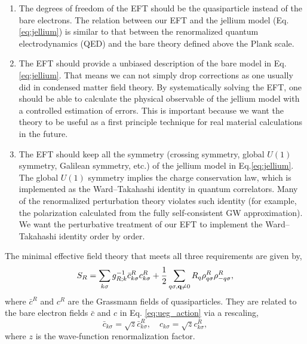 \documentclass[reprint,amsmath,amssymb,aps,prb]{revtex4-1}
\begin{document}
\begin{enumerate}
    \item The degrees of freedom of the EFT should be the quasiparticle instead of the bare electrons. The relation between our EFT and the jellium model (Eq.\eqref{eq:jellium}) is similar to that between the renormalized quantum electrodynamics (QED) and the bare theory defined above the Plank scale.

    \item The EFT should provide a unbiased description of the bare model in Eq.\eqref{eq:jellium}. That means we can not simply drop corrections as one usually did in condensed matter field theory. By systematically solving the EFT, one should be able to calculate the physical observable of the jellium model with a controlled estimation of errors. This is important because we want the theory to be useful as a first principle technique for real material calculations in the future.

    \item The EFT should keep all the symmetry (crossing symmetry, global $U(1)$ symmetry, Galilean symmetry, etc.) of the jellium model in Eq.\eqref{eq:jellium}. The global $U(1)$ symmetry implies the charge conservation law, which is implemented as the Ward–Takahashi identity in quantum correlators. Many of the renormalized perturbation theory violates such identity (for example, the polarization calculated from the fully self-consistent GW approximation). We want the perturbative treatment of our EFT to implement the Ward–Takahashi identity order by order.
\end{enumerate}

The minimal effective field theory that meets all three requirements are given by,
\begin{equation}
    \label{eq:renorm_action}
    S_R=\sum_{k \sigma} g_{R;k}^{-1}\bar{c}^R_{k \sigma} c^R_{k \sigma} + \frac{1}{2}\sum_{q\sigma, \mathbf{q} \neq 0}  R_q \rho^R_{q\sigma} \rho^R_{-q\sigma},
\end{equation}
where $\bar{c}^R$ and $c^R$ are the Grassmann fields of quasiparticles. They are related to the bare electron fields $\bar{c}$ and $c$ in Eq. \eqref{eq:ueg_action} via a rescaling,
\begin{equation}
    \label{eq:rescaling}
    \bar{c}_{k\sigma} = \sqrt{z} \bar{c}^R_{k\sigma}, \quad c_{k\sigma} = \sqrt{z} c^R_{k\sigma},
\end{equation}
where $z$ is the wave-function renormalization factor.
\end{document}
